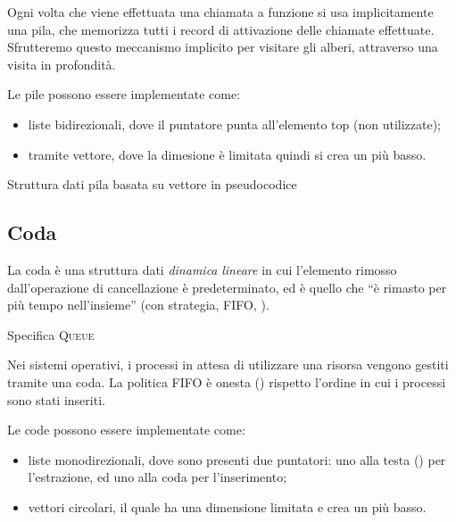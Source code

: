 Ogni volta che viene effettuata una chiamata a funzione si usa implicitamente una pila, che memorizza tutti i record di attivazione delle chiamate effettuate.
Sfrutteremo questo meccanismo implicito per visitare gli alberi, attraverso una visita in profondità.

Le pile possono essere implementate come:
\begin{itemize}
	\item liste bidirezionali, dove il puntatore punta all'elemento \textsf{top} (non utilizzate);
	\item tramite vettore, dove la dimesione è limitata quindi si crea un  più basso.
\end{itemize}

\begin{algorithm}[H]
	\caption*{Struttura dati pila basata su vettore in pseudocodice}
	
\end{algorithm}

\begin{figure}[hp]
\begin{code}
	\label{code:vector-stack}
\end{code}
\end{figure}

\clearpage
\subsection{Coda}

La coda è una struttura dati \emph{dinamica} \emph{lineare} in cui l'elemento rimosso dall'operazione di cancellazione è predeterminato, ed è quello che \enquote{è rimasto per più tempo nell'insieme} (con strategia, \textsc{FIFO}, ).

\begin{algorithm}[H]
	\caption*{Specifica \textsc{Queue}}
	
\end{algorithm}

Nei sistemi operativi, i processi in attesa di utilizzare una risorsa vengono gestiti tramite una coda.
La politica \textsc{FIFO} è onesta () rispetto l'ordine in cui i processi sono stati inseriti.

Le code possono essere implementate come:
\begin{itemize}
	\item liste monodirezionali, dove sono presenti due puntatori: uno alla testa () per l'estrazione, ed uno alla coda per l'inserimento;
	\item vettori circolari, il quale ha una dimensione limitata e crea un  più basso.
\end{itemize}

